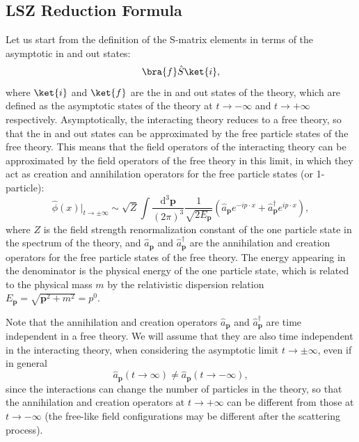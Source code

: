 \subsection{LSZ Reduction Formula}

Let us start from the definition of the S-matrix elements in terms of the asymptotic in and out states:
\[
    \bra{f} \hat{S} \ket{i},
\]
where \(\ket{i}\) and \(\ket{f}\) are the in and out states of the theory, which are defined as the asymptotic states of the theory at \(t \to -\infty\) and \(t \to +\infty\) respectively. Asymptotically, the interacting theory reduces to a free theory, so that the in and out states can be approximated by the free particle states of the free theory. This means that the field operators of the interacting theory can be approximated by the field operators of the free theory in this limit, in which they act as creation and annihilation operators for the free particle states (or 1-particle):
\[
    \hat{\phi}(x) \Big|_{t \to \pm \infty} \sim \sqrt{Z} \int \frac{\mathrm{d}^3 \mathbf{p}}{(2\pi)^3} \frac{1}{\sqrt{2E_{\mathbf{p}}}} \left( \hat{a}_{\mathbf{p}} e^{-ip \cdot x} + \hat{a}_{\mathbf{p}}^\dagger e^{ip \cdot x} \right),
\]
where \(Z\) is the field strength renormalization constant of the one particle state in the spectrum of the theory, and \(\hat{a}_{\mathbf{p}}\) and \(\hat{a}_{\mathbf{p}}^\dagger\) are the annihilation and creation operators for the free particle states of the free theory. The energy appearing in the denominator is the physical energy of the one particle state, which is related to the physical mass \(m\) by the relativistic dispersion relation \(E_{\mathbf{p}} = \sqrt{\mathbf{p}^2 + m^2} = p^0\).

\begin{remark}
    Note that the annihilation and creation operators \(\hat{a}_{\mathbf{p}}\) and \(\hat{a}_{\mathbf{p}}^\dagger\) are time independent in a free theory. We will assume that they are also time independent in the interacting theory, when considering the asymptotic limit \(t \to \pm \infty\), even if in general
    \[
        \hat{a}_{\mathbf{p}}(t \to \infty) \neq \hat{a}_{\mathbf{p}}(t \to -\infty),
    \]
    since the interactions can change the number of particles in the theory, so that the annihilation and creation operators at \(t \to +\infty\) can be different from those at \(t \to -\infty\) (the free-like field configurations may be different after the scattering process).
\end{remark}

